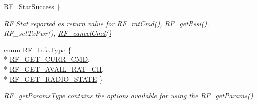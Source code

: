 \begin{DoxyCompactItemize}
\hyperlink{_r_f_8h_afdc219ddabc8427ecd552a6c78d9988faa98bd78e437864464cdb2aca1d3e024d}{R\+F\+\_\+\+Stat\+Success}
 \}
\begin{DoxyCompactList}\small\item\em R\+F Stat reported as return value for R\+F\+\_\+rat\+Cmd(), \hyperlink{_r_f_8h_ac3fe0d39243fb6bbefe0216d958a6779}{R\+F\+\_\+get\+Rssi()}. R\+F\+\_\+set\+Tx\+Pwr(), \hyperlink{_r_f_8h_aabe22ceae13a372be4ba135318aa849a}{R\+F\+\_\+cancel\+Cmd()} \end{DoxyCompactList}\item 
enum \hyperlink{_r_f_8h_a22596109459422a7a4d4f386dffbb8fa}{R\+F\+\_\+\+Info\+Type} \{ \\*
\hyperlink{_r_f_8h_a22596109459422a7a4d4f386dffbb8faa4a4b88384acfaa135421ad57557140e6}{R\+F\+\_\+\+G\+E\+T\+\_\+\+C\+U\+R\+R\+\_\+\+C\+M\+D}, 
\\*
\hyperlink{_r_f_8h_a22596109459422a7a4d4f386dffbb8faa19ebdcf12bef1328ce40fec49c0f6864}{R\+F\+\_\+\+G\+E\+T\+\_\+\+A\+V\+A\+I\+L\+\_\+\+R\+A\+T\+\_\+\+C\+H}, 
\\*
\hyperlink{_r_f_8h_a22596109459422a7a4d4f386dffbb8faa51ac83691ed47bb591818e2e34e49d44}{R\+F\+\_\+\+G\+E\+T\+\_\+\+R\+A\+D\+I\+O\+\_\+\+S\+T\+A\+T\+E}
 \}
\begin{DoxyCompactList}\small\item\em R\+F\+\_\+get\+Params\+Type contains the options available for using the R\+F\+\_\+get\+Params() \end{DoxyCompactList}\end{DoxyCompactItemize}
